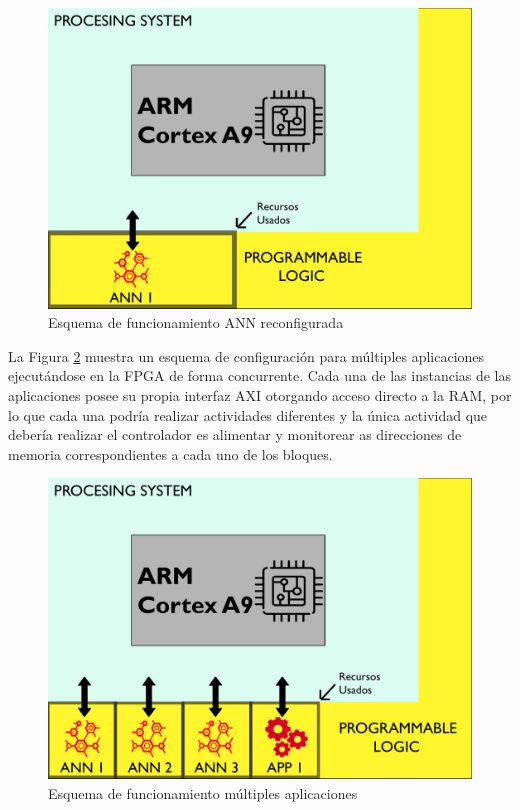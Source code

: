 \begin{figure}[!ht]
	\centering
		\includegraphics[scale=0.5]{Figures/ANN2}
	\caption{Esquema de funcionamiento ANN reconfigurada}
	\label{fig:esquemaFuncionamientoReconfig}
\end{figure}

La Figura \ref{fig:esquemaFuncionamientoReconfig2} muestra un esquema de configuración para múltiples aplicaciones ejecutándose en la FPGA de forma concurrente. Cada una de las instancias de las aplicaciones posee su propia interfaz AXI otorgando acceso directo a la RAM, por lo que cada una podría realizar actividades diferentes y la única actividad que debería realizar el controlador es alimentar y monitorear as direcciones de memoria correspondientes a cada uno de los bloques.

\begin{figure}[!ht]
	\centering
		\includegraphics[scale=0.5]{Figures/ANN3}
	\caption{Esquema de funcionamiento múltiples aplicaciones}
	\label{fig:esquemaFuncionamientoReconfig2}
\end{figure}
